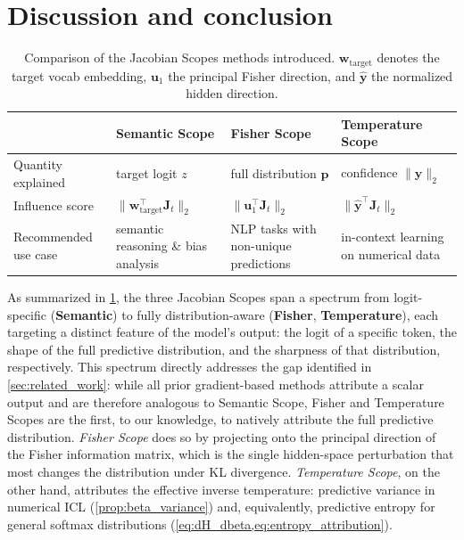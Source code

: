 \documentclass{article}
\begin{document}
\section{Discussion and conclusion}
\label{sec:discussion}


\begin{table}[t]
  \centering
  \caption{
  Comparison of the Jacobian Scopes methods introduced.
  $\bm{w}_{\mathrm{target}}$ denotes the target vocab embedding, 
  $\bm{u}_1$ the principal Fisher direction, and $\hat{\bm{y}}$ the normalized hidden direction.
  }
  \label{tab:jacobian_scopes_summary}
  \renewcommand{\arraystretch}{1.45}
  \setlength{\tabcolsep}{4pt}
  \begin{tabular}{@{}
    >{\raggedright\arraybackslash}p{}
    >{\centering\arraybackslash}p{}
    >{\centering\arraybackslash}p{}
    >{\centering\arraybackslash}p{}@{}}
  \toprule
  & \textbf{Semantic Scope} & \textbf{Fisher Scope} & \textbf{Temperature Scope} \\
  \midrule
  Quantity explained
  & target logit $z$
  & full distribution $\bm p$
  & confidence $\|\bm{y}\|_2$ \\
  Influence score
  & $\|\bm{w}_{\mathrm{target}}^\intercal \bm{J}_t\|_2$
  & $\|\bm{u}_1^\intercal \bm{J}_t\|_2$
  & $\|\hat{\bm{y}}^\intercal\bm{J}_t\|_2$ \\
  Recommended use case
  & semantic reasoning \& bias analysis
  & NLP tasks with non-unique predictions
  & in-context learning on numerical data \\
  \bottomrule
  \end{tabular}
\end{table}

As summarized in \cref{tab:jacobian_scopes_summary}, the three Jacobian Scopes span a spectrum from logit-specific (\textbf{Semantic}) to fully distribution-aware (\textbf{Fisher}, \textbf{Temperature}), each targeting a distinct feature of the model's output: the logit of a specific token, the shape of the full predictive distribution, and the sharpness of that distribution, respectively.
This spectrum directly addresses the gap identified in \cref{sec:related_work}: while all prior gradient-based methods attribute a scalar output and are therefore analogous to Semantic Scope, Fisher and Temperature Scopes are the first, to our knowledge, to natively attribute the full predictive distribution.
\emph{Fisher Scope} does so by projecting onto the principal direction of the Fisher information matrix, which is the single hidden-space perturbation that most changes the distribution under KL divergence. \emph{Temperature Scope}, on the other hand, attributes the effective inverse temperature: predictive variance in numerical ICL (\cref{prop:beta_variance}) and, equivalently, predictive entropy for general softmax distributions (\cref{eq:dH_dbeta,eq:entropy_attribution}).
\end{document}
